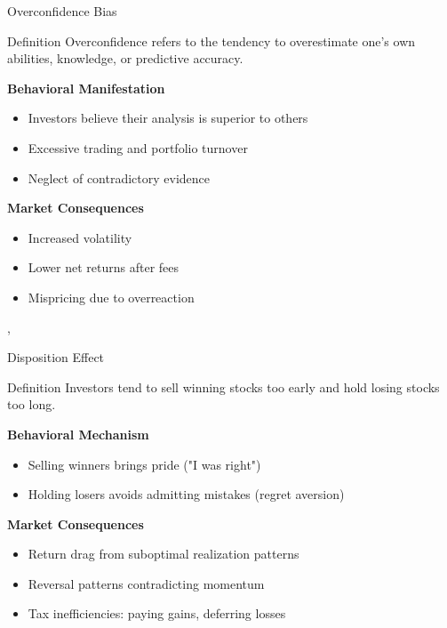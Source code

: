 \begin{frame}{Overconfidence Bias}
	
	\begin{block}{Definition}  
		Overconfidence refers to the tendency to overestimate one's own abilities, knowledge, or predictive accuracy.
	\end{block}
	

	\textbf{Behavioral Manifestation}
	\begin{itemize}
		\item Investors believe their analysis is superior to others
		\item Excessive trading and portfolio turnover
		\item Neglect of contradictory evidence
	\end{itemize}
	

	\textbf{Market Consequences}
	\begin{itemize}
		\item Increased volatility
		\item Lower net returns after fees
		\item Mispricing due to overreaction
	\end{itemize}
	

	\tiny{\textcite{odean1998volume}, \textcite{barber2001boys}}
\end{frame}

\begin{frame}{Disposition Effect}
	
	\begin{block}{Definition}  
		Investors tend to sell winning stocks too early and hold losing stocks too long.
	\end{block}
	
	

	\textbf{Behavioral Mechanism}
	\begin{itemize}
		\item Selling winners brings pride ("I was right")
		\item Holding losers avoids admitting mistakes (regret aversion)
	\end{itemize}
	

	\textbf{Market Consequences}
	\begin{itemize}
		\item Return drag from suboptimal realization patterns
		\item Reversal patterns contradicting momentum
		\item Tax inefficiencies: paying gains, deferring losses
	\end{itemize}
	
	\vspace{0.2cm}
	\tiny{\textcite{shefrin1985disposition}}
\end{frame}

